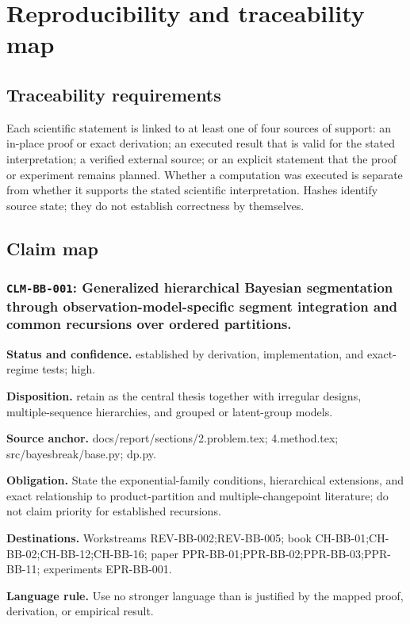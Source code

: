
\chapter{Reproducibility and traceability map}
\label{app:traceability}

\section{Traceability requirements}
Each scientific statement is linked to at least one of four sources of support: an in-place proof or exact derivation; an executed result that is valid for the stated interpretation; a verified external source; or an explicit statement that the proof or experiment remains planned. Whether a computation was executed is separate from whether it supports the stated scientific interpretation. Hashes identify source state; they do not establish correctness by themselves.

\section{Claim map}
\subsection[\texttt{CLM-BB-001}]{\texttt{CLM-BB-001}: Generalized hierarchical Bayesian segmentation through observation-model-specific segment integration and common recursions over ordered partitions.}
\textbf{Status and confidence.} established by derivation, implementation, and exact-regime tests; high.\par
\textbf{Disposition.} retain as the central thesis together with irregular designs, multiple-sequence hierarchies, and grouped or latent-group models.\par
\textbf{Source anchor.} docs/report/sections/2.problem.tex; 4.method.tex; src/bayesbreak/base.py; dp.py.\par
\textbf{Obligation.} State the exponential-family conditions, hierarchical extensions, and exact relationship to product-partition and multiple-changepoint literature; do not claim priority for established recursions.\par
\textbf{Destinations.} Workstreams REV-BB-002;REV-BB-005; book CH-BB-01;CH-BB-02;CH-BB-12;CH-BB-16; paper PPR-BB-01;PPR-BB-02;PPR-BB-03;PPR-BB-11; experiments EPR-BB-001.\par
\textbf{Language rule.} Use no stronger language than is justified by the mapped proof, derivation, or empirical result.

